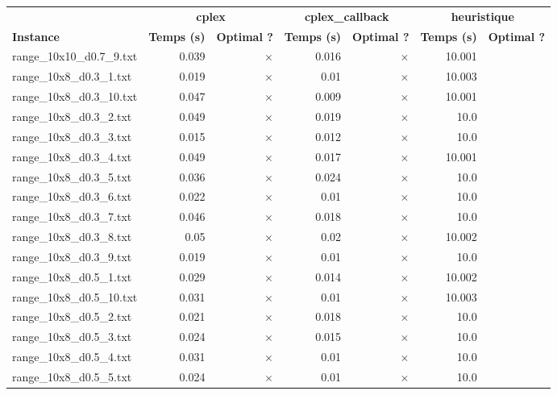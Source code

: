 \documentclass{article}
\begin{document}
\newpage
\begin{center}
\renewcommand{\arraystretch}{1.4} 
 \begin{tabular}{lrrrrrr}
	\hline
 & \multicolumn{2}{c}{\textbf{cplex}} & \multicolumn{2}{c}{\textbf{cplex_callback}} & \multicolumn{2}{c}{\textbf{heuristique}}\\
\textbf{Instance}  & \textbf{Temps (s)} & \textbf{Optimal ?}  & \textbf{Temps (s)} & \textbf{Optimal ?}  & \textbf{Temps (s)} & \textbf{Optimal ?} \\\hline

range\_10x10\_d0.7\_9.txt & 0.039 & 
$\times$
 & 0.016 & 
$\times$
 & 10.001 & 
\\
range\_10x8\_d0.3\_1.txt & 0.019 & 
$\times$
 & 0.01 & 
$\times$
 & 10.003 & 
\\
range\_10x8\_d0.3\_10.txt & 0.047 & 
$\times$
 & 0.009 & 
$\times$
 & 10.001 & 
\\
range\_10x8\_d0.3\_2.txt & 0.049 & 
$\times$
 & 0.019 & 
$\times$
 & 10.0 & 
\\
range\_10x8\_d0.3\_3.txt & 0.015 & 
$\times$
 & 0.012 & 
$\times$
 & 10.0 & 
\\
range\_10x8\_d0.3\_4.txt & 0.049 & 
$\times$
 & 0.017 & 
$\times$
 & 10.001 & 
\\
range\_10x8\_d0.3\_5.txt & 0.036 & 
$\times$
 & 0.024 & 
$\times$
 & 10.0 & 
\\
range\_10x8\_d0.3\_6.txt & 0.022 & 
$\times$
 & 0.01 & 
$\times$
 & 10.0 & 
\\
range\_10x8\_d0.3\_7.txt & 0.046 & 
$\times$
 & 0.018 & 
$\times$
 & 10.0 & 
\\
range\_10x8\_d0.3\_8.txt & 0.05 & 
$\times$
 & 0.02 & 
$\times$
 & 10.002 & 
\\
range\_10x8\_d0.3\_9.txt & 0.019 & 
$\times$
 & 0.01 & 
$\times$
 & 10.0 & 
\\
range\_10x8\_d0.5\_1.txt & 0.029 & 
$\times$
 & 0.014 & 
$\times$
 & 10.002 & 
\\
range\_10x8\_d0.5\_10.txt & 0.031 & 
$\times$
 & 0.01 & 
$\times$
 & 10.003 & 
\\
range\_10x8\_d0.5\_2.txt & 0.021 & 
$\times$
 & 0.018 & 
$\times$
 & 10.0 & 
\\
range\_10x8\_d0.5\_3.txt & 0.024 & 
$\times$
 & 0.015 & 
$\times$
 & 10.0 & 
\\
range\_10x8\_d0.5\_4.txt & 0.031 & 
$\times$
 & 0.01 & 
$\times$
 & 10.0 & 
\\
range\_10x8\_d0.5\_5.txt & 0.024 & 
$\times$
 & 0.01 & 
$\times$
 & 10.0 & 
\\

\end{tabular}
\end{center}
\end{document}
